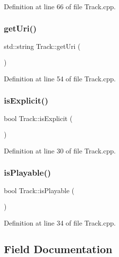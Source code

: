 Definition at line 66 of file Track.\+cpp.

\mbox{\label{class_track_a7b27de9debf1c3150820fed6352bf1f9}} 
\subsubsection{\texorpdfstring{get\+Uri()}{getUri()}}
{\footnotesize\ttfamily std\+::string Track\+::get\+Uri (\begin{DoxyParamCaption}{ }\end{DoxyParamCaption})}



Definition at line 54 of file Track.\+cpp.

\mbox{\label{class_track_ade5868ca1e69e508299b74dba0210b24}} 
\subsubsection{\texorpdfstring{is\+Explicit()}{isExplicit()}}
{\footnotesize\ttfamily bool Track\+::is\+Explicit (\begin{DoxyParamCaption}{ }\end{DoxyParamCaption})}



Definition at line 30 of file Track.\+cpp.

\mbox{\label{class_track_a19e4cc8c2c8dcfe0d8bf765c07ce79c9}} 
\subsubsection{\texorpdfstring{is\+Playable()}{isPlayable()}}
{\footnotesize\ttfamily bool Track\+::is\+Playable (\begin{DoxyParamCaption}{ }\end{DoxyParamCaption})}



Definition at line 34 of file Track.\+cpp.



\subsection{Field Documentation}
\mbox{\label{class_track_a8700b8ebbd19db2dc2468a8a870ca8c4}} 
